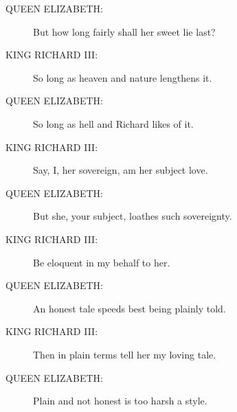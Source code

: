 \documentclass{article}
\begin{document}
\begin{description}
\item[QUEEN ELIZABETH:] 
\hspace{1pt}But how long fairly shall her sweet lie last?\\
\end{description}
\begin{description}
\item[KING RICHARD III:] 
\hspace{1pt}So long as heaven and nature lengthens it.\\
\end{description}
\begin{description}
\item[QUEEN ELIZABETH:] 
\hspace{1pt}So long as hell and Richard likes of it.\\
\end{description}
\begin{description}
\item[KING RICHARD III:] 
\hspace{1pt}Say, I, her sovereign, am her subject love.\\
\end{description}
\begin{description}
\item[QUEEN ELIZABETH:] 
\hspace{1pt}But she, your subject, loathes such sovereignty.\\
\end{description}
\begin{description}
\item[KING RICHARD III:] 
\hspace{1pt}Be eloquent in my behalf to her.\\
\end{description}
\begin{description}
\item[QUEEN ELIZABETH:] 
\hspace{1pt}An honest tale speeds best being plainly told.\\
\end{description}
\begin{description}
\item[KING RICHARD III:] 
\hspace{1pt}Then in plain terms tell her my loving tale.\\
\end{description}
\begin{description}
\item[QUEEN ELIZABETH:] 
\hspace{1pt}Plain and not honest is too harsh a style.\\
\end{description}
\end{document}
